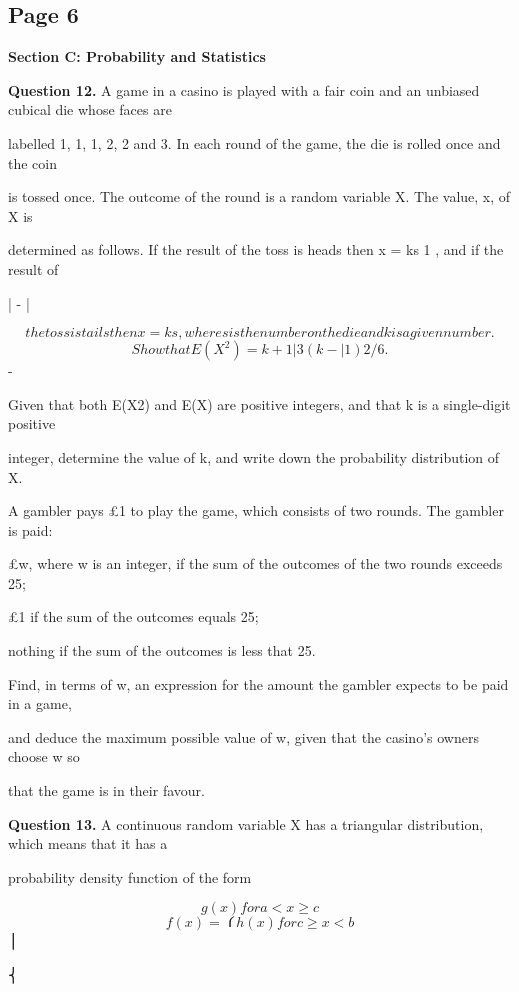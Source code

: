 \documentclass[12pt]{article}
\begin{document}
\subsection*{Page 6}
\begin{flushleft}
\bigskip\textbf{Section C: Probability and Statistics}\par
\bigskip\textbf{Question 12.} A game in a casino is played with a fair coin and an unbiased cubical die whose faces are\par
labelled 1, 1, 1, 2, 2 and 3. In each round of the game, the die is rolled once and the coin\par
is tossed once. The outcome of the round is a random variable X. The value, x, of X is\par
determined as follows. If the result of the toss is heads then x = ks 1 , and if the result of\par
| - |\par
\[the toss is tails then x = k s , where s is the number on the die and k is a given number.\]
\[Show that E(X^2) = k + 1 | 3(k - | 1)2/6.\]
-\par
Given that both E(X2) and E(X) are positive integers, and that k is a single-digit positive\par
integer, determine the value of k, and write down the probability distribution of X.\par
A gambler pays \pounds 1 to play the game, which consists of two rounds. The gambler is paid:\par
\pounds  w, where w is an integer, if the sum of the outcomes of the two rounds exceeds 25;\par
\pounds 1 if the sum of the outcomes equals 25;\par
nothing if the sum of the outcomes is less that 25.\par
Find, in terms of w, an expression for the amount the gambler expects to be paid in a game,\par
and deduce the maximum possible value of w, given that the casino's owners choose w so\par
that the game is in their favour.\par
\bigskip\textbf{Question 13.} A continuous random variable X has a triangular distribution, which means that it has a\par
probability density function of the form\par
\[g(x) for a < x \geq c\]
\[f(x) = ⎧ h(x) for c \geq x < b\]
⎪\par
⎨\par

\end{flushleft}
\end{document}
